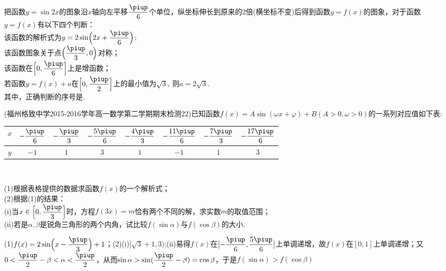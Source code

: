 \begin{exercise}
    \item%
      把函数$ y=\sin 2x $的图象沿$x$轴向左平移$ \dfrac{\piup}{6} $个单位，纵坐标伸长到原来的2倍(横坐标不变)后得到函数$ y=f(x) $的图象，对于函数$ y=f(x) $有以下四个判断：\\
       该函数的解析式为$ y=2\sin \Bigl(2x+\dfrac{\piup}{6}\Bigr) $;\\
       该函数图象关于点$ \Bigl(\dfrac{\piup}{3},0\Bigr) $对称；\\
       该函数在$ \Bigl[0,\dfrac{\piup}{6}\Bigr] $上是增函数；\\
       若函数$ y=f(x)+a $在$ \Bigl[0,\dfrac{\piup}{2}\Bigr] $上的最小值为$ \sqrt{3},\  $则$ a=2\sqrt{3} .$\\
      其中，正确判断的序号是\tk.
      \begin{answer}
      \end{answer}
    \item%
      (福州格致中学2015-2016学年高一数学第二学期期末检测22)已知函数$f(x)=A\sin(\omega x+\varphi)+B (A>0,\omega>0)$的一系列对应值如下表:
      \begin{center}
        \renewcommand{\arraystretch}{1.4}
        \begin{tabular}{|*{8}{c|}}
          \hline
            $x$
            &$-\dfrac{\piup}6$
            &$-\dfrac{\piup}3$
            &$-\dfrac{5\piup}6$
            &$-\dfrac{4\piup}3$
            &$-\dfrac{11\piup}6$
            &$-\dfrac{7\piup}3$
            &$-\dfrac{17\piup}6$\\
          \hline
            $y$
            &$-1$
            &$1$
            &$3$
            &$1$
            &$-1$
            &$1$
            &$3$\\
          \hline
        \end{tabular}\\
      \end{center}
      (1)根据表格提供的数据求函数$f(x)$的一个解析式；\\
      (2)根据(1)的结果：\\
      \;(i)当$x\in\Bigl[0,\dfrac{\piup}3\Bigr]$时，方程$f(3x)=m$恰有两个不同的解，求实数$m$的取值范围；\\
      \;(ii)若是$\alpha,\beta$是锐角三角形的两个内角，试比较$f(\sin \alpha)$与$f(\cos \beta)$的大小.
      \begin{answer}
        (1)$f(x)=2\sin\Bigl(x-\dfrac{\piup}3\Bigr)+1$；(2)(i)$[\sqrt{3}+1,3)$;(ii)易得$f(x)$在$[-\dfrac{\piup}6,\dfrac{5\piup}6]$上单调递增，故$f(x)$在$[0,1]$上单调递增；又$0<\dfrac{\piup}2-\beta<\alpha<\dfrac{\piup}2$，从而$\sin\alpha>\sin(\dfrac{\piup}2-\beta)=\cos\beta$，于是$f(\sin \alpha)>f(\cos \beta)$

\end{answer}
\end{exercise}
